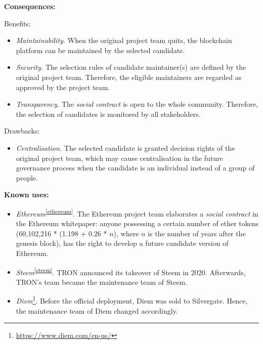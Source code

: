 \documentclass{article}
\begin{document}
\vspace{0.5em}\noindent \textbf{Consequences:} 

Benefits:
\begin{itemize}
  \item \textit{Maintainability.}  When the original project team quits, the blockchain platform can be maintained by the selected candidate.
  
  \item \textit{Security.} The selection rules of candidate maintainer(s) are defined by the original project team. Therefore, the eligible maintainers are regarded as approved by the project team.

  
  \item \textit{Transparency.} The \textit{social contract} is open to the whole community. Therefore, the selection of candidates is monitored by all stakeholders.
\end{itemize}

Drawbacks:
\begin{itemize}
  \item \textit{Centralisation.} The selected candidate is granted decision rights of the original project team, which may cause centralisation in the future governance process when the candidate is an individual instead of a group of people.
\end{itemize}



\vspace{0.5em}\noindent \textbf{Known uses:}  
 \begin{itemize}
   \item \textit{Ethereum}\textsuperscript{\ref{ethereum}}. The Ethereum project team elaborates a \textit{social contract} in the Ethereum whitepaper: anyone possessing a certain number of ether tokens (60,102,216 * (1.198 + 0.26 * $n$), where $n$ is the number of years after the genesis block), has the right to develop a future candidate version of Ethereum. 
   
   \item \textit{Steem}\textsuperscript{\ref{steem}}. TRON announced its takeover of Steem in 2020. Afterwards, TRON's team became the maintenance team of Steem.
   
   \item \textit{Diem}\footnote{\url{https://www.diem.com/en-us/}}. Before the official deployment, Diem was sold to Silvergate. Hence, the maintenance team of Diem changed accordingly.
 \end{itemize}
\end{document}
